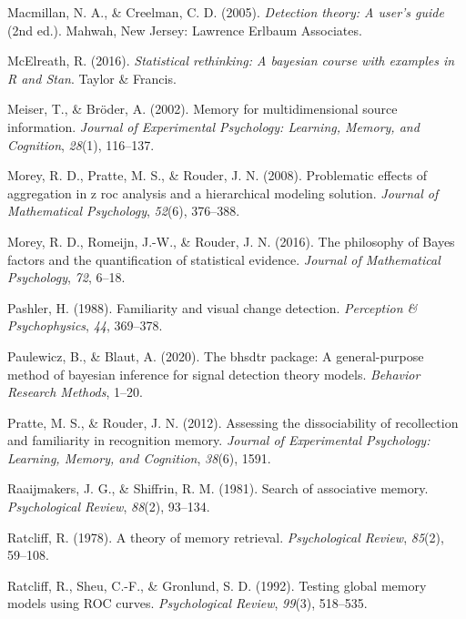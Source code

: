 \documentclass[
  english,
  ,man,floatsintext]{apa6}
\begin{document}
\leavevmode\hypertarget{ref-MacmillanAndCreelman2005}{}%
Macmillan, N. A., \& Creelman, C. D. (2005). \emph{Detection theory: A user's guide} (2nd ed.). Mahwah, New Jersey: Lawrence Erlbaum Associates.

\leavevmode\hypertarget{ref-McElreath2016}{}%
McElreath, R. (2016). \emph{Statistical rethinking: A bayesian course with examples in R and Stan}. Taylor \& Francis.

\leavevmode\hypertarget{ref-MeiserAndBroder2002}{}%
Meiser, T., \& Bröder, A. (2002). Memory for multidimensional source information. \emph{Journal of Experimental Psychology: Learning, Memory, and Cognition}, \emph{28}(1), 116--137.

\leavevmode\hypertarget{ref-morey2008problematic}{}%
Morey, R. D., Pratte, M. S., \& Rouder, J. N. (2008). Problematic effects of aggregation in z roc analysis and a hierarchical modeling solution. \emph{Journal of Mathematical Psychology}, \emph{52}(6), 376--388.

\leavevmode\hypertarget{ref-MoreyEtAl2016}{}%
Morey, R. D., Romeijn, J.-W., \& Rouder, J. N. (2016). The philosophy of Bayes factors and the quantification of statistical evidence. \emph{Journal of Mathematical Psychology}, \emph{72}, 6--18.

\leavevmode\hypertarget{ref-Pashler1988}{}%
Pashler, H. (1988). Familiarity and visual change detection. \emph{Perception \& Psychophysics}, \emph{44}, 369--378.

\leavevmode\hypertarget{ref-paulewicz2020bhsdtr}{}%
Paulewicz, B., \& Blaut, A. (2020). The bhsdtr package: A general-purpose method of bayesian inference for signal detection theory models. \emph{Behavior Research Methods}, 1--20.

\leavevmode\hypertarget{ref-pratte2012assessing}{}%
Pratte, M. S., \& Rouder, J. N. (2012). Assessing the dissociability of recollection and familiarity in recognition memory. \emph{Journal of Experimental Psychology: Learning, Memory, and Cognition}, \emph{38}(6), 1591.

\leavevmode\hypertarget{ref-RaaijmakersAndShiffrin1981}{}%
Raaijmakers, J. G., \& Shiffrin, R. M. (1981). Search of associative memory. \emph{Psychological Review}, \emph{88}(2), 93--134.

\leavevmode\hypertarget{ref-Ratcliff1978}{}%
Ratcliff, R. (1978). A theory of memory retrieval. \emph{Psychological Review}, \emph{85}(2), 59--108.

\leavevmode\hypertarget{ref-RatcliffEtAl1992}{}%
Ratcliff, R., Sheu, C.-F., \& Gronlund, S. D. (1992). Testing global memory models using ROC curves. \emph{Psychological Review}, \emph{99}(3), 518--535.
\end{document}
